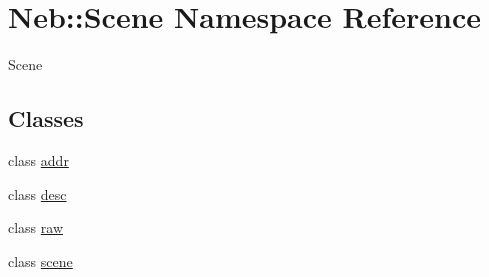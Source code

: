 \hypertarget{namespaceNeb_1_1Scene}{\section{\-Neb\-:\-:\-Scene \-Namespace \-Reference}
\label{namespaceNeb_1_1Scene}
}


\-Scene  


\subsection*{\-Classes}
\begin{DoxyCompactItemize}
\item 
class \hyperlink{classNeb_1_1Scene_1_1addr}{addr}
\item 
class \hyperlink{classNeb_1_1Scene_1_1desc}{desc}
\item 
class \hyperlink{classNeb_1_1Scene_1_1raw}{raw}
\item 
class \hyperlink{classNeb_1_1Scene_1_1scene}{scene}
\end{DoxyCompactItemize}
